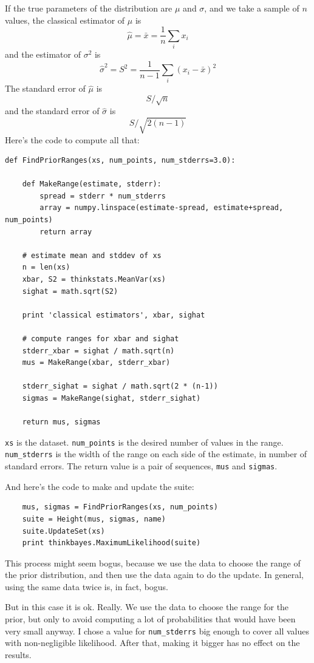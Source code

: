 \documentclass[12pt]{book}
\begin{document}
If the true parameters of the distribution are $\mu$ and
$\sigma$, and we take a sample of $n$ values, the classical estimator
of $\mu$ is
%
\[ \hat{\mu} = \bar{x} = \frac{1}{n} \sum_i x_i \]
%
and the estimator of $\sigma^2$ is
%
\[ \hat{\sigma}^2 = S^2 = \frac{1}{n-1} \sum_i (x_i - \bar{x})^2 \]
%
The standard error of $\hat{\mu}$ is
%
\[ S / \sqrt{n} \]
%
and the standard error of $\hat{\sigma}$ is
%
\[ S / \sqrt{2 (n-1)}\]
%
Here's the code to compute all that:

\begin{verbatim}
def FindPriorRanges(xs, num_points, num_stderrs=3.0):

    def MakeRange(estimate, stderr):
        spread = stderr * num_stderrs
        array = numpy.linspace(estimate-spread, estimate+spread, num_points)
        return array

    # estimate mean and stddev of xs
    n = len(xs)
    xbar, S2 = thinkstats.MeanVar(xs)
    sighat = math.sqrt(S2)

    print 'classical estimators', xbar, sighat

    # compute ranges for xbar and sighat
    stderr_xbar = sighat / math.sqrt(n)
    mus = MakeRange(xbar, stderr_xbar)

    stderr_sighat = sighat / math.sqrt(2 * (n-1))
    sigmas = MakeRange(sighat, stderr_sighat)

    return mus, sigmas
\end{verbatim}

{\tt xs} is the dataset.  \verb"num_points" is the desired number of
values in the range.  \verb"num_stderrs" is the width of the range on
each side of the estimate, in number of standard errors.  The return
value is a pair of sequences, {\tt mus} and {\tt sigmas}.

And here's the code to make and update the suite:

\begin{verbatim}
    mus, sigmas = FindPriorRanges(xs, num_points)
    suite = Height(mus, sigmas, name)
    suite.UpdateSet(xs)
    print thinkbayes.MaximumLikelihood(suite)    
\end{verbatim}

This process might seem bogus, because we 
use the data to choose the range of the prior distribution, and then
use the data again to do the update.  In general, using the same
data twice is, in fact, bogus.

But in this case it is ok.  Really.  We use the data to choose
the range for the prior, but only to avoid computing
a lot of probabilities that would have been very small anyway.
I chose a value for \verb"num_stderrs" big enough to
cover all values with non-negligible likelihood.  After that, making
it bigger has no effect on the results.
\end{document}
